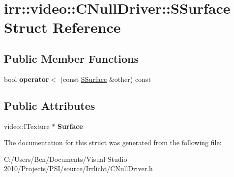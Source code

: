 \hypertarget{structirr_1_1video_1_1_c_null_driver_1_1_s_surface}{\section{irr\-:\-:video\-:\-:C\-Null\-Driver\-:\-:S\-Surface Struct Reference}
\label{structirr_1_1video_1_1_c_null_driver_1_1_s_surface}
}
\subsection*{Public Member Functions}
\begin{DoxyCompactItemize}
\item 
\hypertarget{structirr_1_1video_1_1_c_null_driver_1_1_s_surface_afeaa1a0007ec847c2c93327dc4eeb6b7}{bool {\bfseries operator$<$} (const \hyperlink{structirr_1_1video_1_1_c_null_driver_1_1_s_surface}{S\-Surface} \&other) const }\label{structirr_1_1video_1_1_c_null_driver_1_1_s_surface_afeaa1a0007ec847c2c93327dc4eeb6b7}

\end{DoxyCompactItemize}
\subsection*{Public Attributes}
\begin{DoxyCompactItemize}
\item 
\hypertarget{structirr_1_1video_1_1_c_null_driver_1_1_s_surface_a9c62e473c7298de2f2a531241c54d29b}{video\-::\-I\-Texture $\ast$ {\bfseries Surface}}\label{structirr_1_1video_1_1_c_null_driver_1_1_s_surface_a9c62e473c7298de2f2a531241c54d29b}

\end{DoxyCompactItemize}


The documentation for this struct was generated from the following file\-:\begin{DoxyCompactItemize}
\item 
C\-:/\-Users/\-Ben/\-Documents/\-Visual Studio 2010/\-Projects/\-P\-S\-I/source/\-Irrlicht/C\-Null\-Driver.\-h\end{DoxyCompactItemize}
